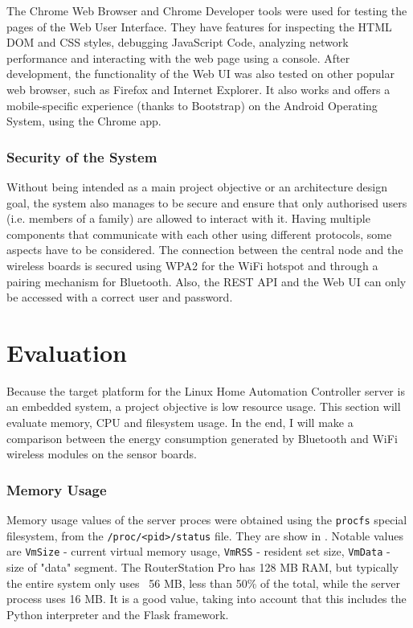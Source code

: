 The Chrome Web Browser and Chrome Developer tools were used for testing the pages of the Web User Interface. They have features for inspecting the HTML DOM and CSS styles, debugging JavaScript Code, analyzing network performance and interacting with the web page using a console. After development, the functionality of the Web UI was also tested on other popular web browser, such as Firefox and Internet Explorer. It also works and offers a mobile-specific experience (thanks to Bootstrap) on the Android Operating System, using the Chrome app.

\subsubsection{Security of the System}

Without being intended as a main project objective or an architecture design goal, the system also manages to be secure and ensure that only authorised users (i.e. members of a family) are allowed to interact with it. Having multiple components that communicate with each other using different protocols, some aspects have to be considered. The connection between the central node and the wireless boards is secured using WPA2 for the WiFi hotspot and through a pairing mechanism for Bluetooth. Also, the REST API and the Web UI can only be accessed with a correct user and password.

\section{Evaluation}

Because the target platform for the Linux Home Automation Controller server is an embedded system, a project objective is low resource usage. This section will evaluate memory, CPU and filesystem usage. In the end, I will make a comparison between the energy consumption generated by Bluetooth and WiFi wireless modules on the sensor boards.


\subsubsection{Memory Usage}

Memory usage values of the server proces were obtained using the \texttt{procfs} special filesystem, from the \texttt{/proc/<pid>/status} file. They are show in . Notable values are \texttt{VmSize} - current virtual memory usage, \texttt{VmRSS} - resident set size, \texttt{VmData} - size of "data" segment. The RouterStation Pro has 128 MB RAM, but typically the entire system only uses ~56 MB, less than 50\% of the total, while the server process uses 16 MB. It is a good value, taking into account that this includes the Python interpreter and the Flask framework.

